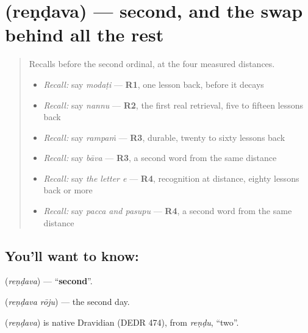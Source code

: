 \section[\texorpdfstring{\te{రెండవ} (reṇḍava)}{రెండవ (reṇḍava)}]{ (reṇḍava) — second, and the swap behind all the rest}

\label{lesson:TE-C81-second}



\begin{quote}
Recalls before the second ordinal, at the four measured distances.

\begin{itemize}
\raggedright
  \item \emph{Recall:} say \emph{modaṭi} — \textbf{R1}, one lesson back, before it decays
  \item \emph{Recall:} say \emph{nannu} — \textbf{R2}, the first real retrieval, five to fifteen lessons back
  \item \emph{Recall:} say \emph{rampaṁ} — \textbf{R3}, durable, twenty to sixty lessons back
  \item \emph{Recall:} say \emph{bāva} — \textbf{R3}, a second word from the same distance
  \item \emph{Recall:} say \emph{the letter e} — \textbf{R4}, recognition at distance, eighty lessons back or more
  \item \emph{Recall:} say \emph{pacca and pasupu} — \textbf{R4}, a second word from the same distance
\end{itemize}
\end{quote}

\subsection*{You'll want to know: }
\textbf{} (\emph{reṇḍava}) — \textquotedblleft{}\textbf{second}\textquotedblright{}.

\textbf{ } (\emph{reṇḍava rōju}) — the second day.

\begin{cousinweb}
\textbf{} (\emph{reṇḍava}) is native Dravidian (DEDR 474), from \emph{reṇḍu}, \textquotedblleft{}two\textquotedblright{}.
\end{cousinweb}

